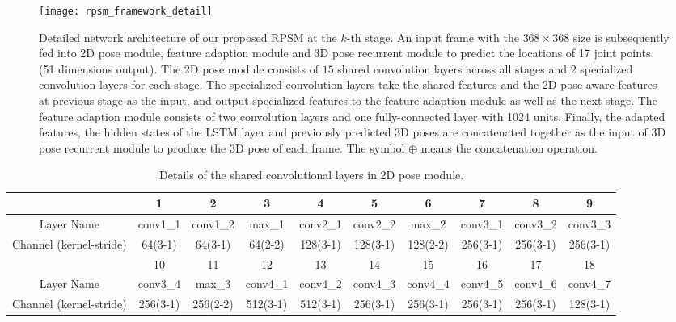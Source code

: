 \documentclass[10pt,twocolumn,letterpaper]{article}
\begin{document}
\begin{figure*}[ht]
	\centering
	\texttt{[image: rpsm\_framework\_detail]}
	\vspace{-10pt}
	\caption{Detailed network architecture of our proposed RPSM at the $k$-th stage. An input frame with the $368\times368$ size is subsequently fed into 2D pose module, feature adaption module and 3D pose recurrent module to predict the locations of 17 joint points (51 dimensions output). The 2D pose module consists of $15$ shared convolution layers across all stages and $2$ specialized convolution layers for each stage. The specialized convolution layers take the shared features and the 2D pose-aware features at previous stage as the input, and output specialized features to the feature adaption module as well as the next stage. The feature adaption module consists of two convolution layers and one fully-connected layer with 1024 units. Finally, the adapted features, the hidden states of the LSTM layer and previously predicted 3D poses are concatenated together as the input of 3D pose recurrent module to produce the 3D pose of each frame. The symbol $\oplus$ means the concatenation operation.}
	\label{fig:stage_detail}
	\vspace{-10pt}
\end{figure*}

\begin{table*}
\label{fig:2D_network_shared}
\begin{adjustbox}{max width=1.0\textwidth}
\begin{tabular}{|c|c|c|c|c|c|c|c|c|c|}
\hline
 & 1 & 2 & 3 & 4 & 5 & 6 & 7 & 8 & 9 \\ \hline
Layer Name & conv1\_1 & conv1\_2 & max\_1 & conv2\_1 & conv2\_2 & max\_2 & conv3\_1 & conv3\_2 & conv3\_3 \\ \hline
Channel (kernel-stride) & 64(3-1) & 64(3-1) & 64(2-2) & 128(3-1) & 128(3-1) & 128(2-2) & 256(3-1) & 256(3-1) & 256(3-1) \\ \hline
 & 10 & 11 & 12 & 13 & 14 & 15 & 16 & 17 & 18 \\ \hline
Layer Name & conv3\_4 & max\_3 & conv4\_1 & conv4\_2 & conv4\_3 & conv4\_4 & conv4\_5 & conv4\_6 & conv4\_7 \\ \hline
Channel (kernel-stride) & 256(3-1) & 256(2-2) & 512(3-1) & 512(3-1) & 256(3-1) & 256(3-1) & 256(3-1) & 256(3-1) & 128(3-1) \\ \hline
\end{tabular}
\end{adjustbox}
\vspace{-10pt}
\caption{Details of the shared convolutional layers in 2D pose module. }
\label{table:shared_network_details}
\vspace{-10pt}
\end{table*}
\end{document}
